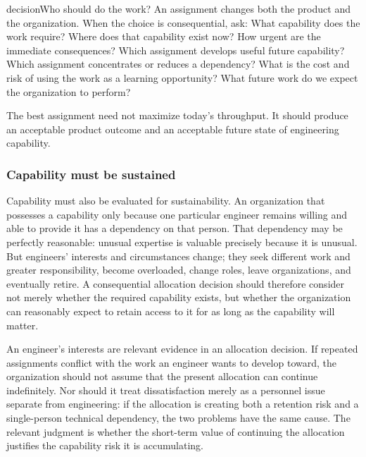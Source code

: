 \begin{bookbox}{decision}{Who should do the work?} %
An assignment changes both the product and the organization. When the choice is consequential, ask:
What capability does the work require? Where does that capability exist now? How urgent are the
immediate consequences? Which assignment develops useful future capability? Which assignment
concentrates or reduces a dependency? What is the cost and risk of using the work as a learning
opportunity? What future work do we expect the organization to perform?

The best assignment need not maximize today's throughput. It should produce an acceptable product
outcome and an acceptable future state of engineering capability.
\end{bookbox}

\subsubsection{Capability must be sustained}\label{sec-capability-sustained}

Capability must also be evaluated for sustainability. An organization that possesses a capability
only because one particular engineer remains willing and able to provide it has a dependency on
that person. That dependency may be perfectly reasonable: unusual expertise is valuable precisely
because it is unusual. But engineers' interests and circumstances change; they seek different work
and greater responsibility, become overloaded, change roles, leave organizations, and eventually
retire. A consequential allocation decision should therefore consider not merely whether the
required capability exists, but whether the organization can reasonably expect to retain access to
it for as long as the capability will matter.

An engineer's interests are relevant evidence in an allocation decision. If repeated assignments
conflict with the work an engineer wants to develop toward, the organization should not assume that
the present allocation can continue indefinitely. Nor should it treat dissatisfaction merely as a
personnel issue separate from engineering: if the allocation is creating both a retention risk and
a single-person technical dependency, the two problems have the same cause. The relevant judgment
is whether the short-term value of continuing the allocation justifies the capability risk it is
accumulating.

